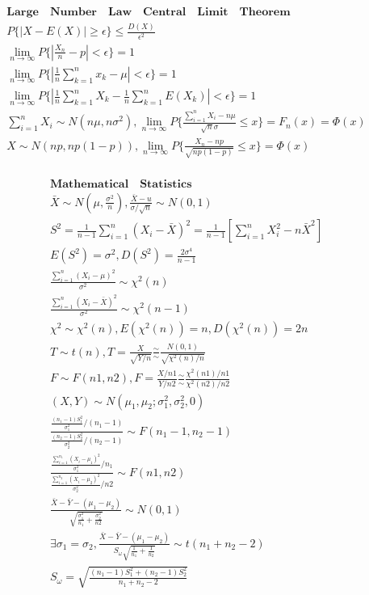 \documentclass{article}
\begin{document}
\begin{align*}
    \bm{Large \quad Number \quad Law \quad Central \quad Limit \quad Theorem } \\ 
    P \{ {|X-E(X)|\ge \epsilon} \} \le \frac{D(X)}{\epsilon^{2}} \\
    \lim_{n \to \infty}P\{|\frac{X_{n}}{n}-p| < \epsilon\} = 1 \\
    \lim_{n \to \infty}P\{|\frac{1}{n}\sum_{k=1}^nx_{k}-\mu|<\epsilon\} = 1 \\
    \lim_{n \to \infty}P\{|\frac{1}{n}\sum_{k=1}^n X_{k} - \frac{1}{n}\sum_{k=1}^n E(X_{k})| < \epsilon\} = 1 \\ 
    \sum_{i=1}^{n}X_{i} \sim N(n\mu,n\sigma^2), \lim_{n \to \infty}P\{\frac{\sum_{i=1}^nX_{i}-n\mu}{\sqrt{n}\sigma} \le x\} = F_{n}(x) = \Phi(x) \\ 
    X \sim N(np,np(1-p)), \lim_{n \to \infty }P\{\frac{X_{n}-np}{\sqrt{np(1-p)}} \le x \} = \Phi(x) \\ 
\end{align*}

\clearpage
\begin{align*}
    \bm{Mathematical \quad Statistics} \\ 
    \bar{X} \sim N(\mu,\frac{\sigma^2}{n}), \frac{\bar{X}-u}{\sigma/\sqrt{n}} \sim N(0,1)\\ 
    S^2 = \frac{1}{n-1}\sum_{i=1}^n(X_{i}-\bar{X})^2 = \frac{1}{n-1}[\sum_{i=1}^nX_{i}^2 - n \bar{X}^2] \\ 
    E(S^2) = \sigma^2, D(S^2) = \frac{2\sigma^4}{n-1} \\ 
    \frac{\sum_{i=1}^n(X_{i}-\mu)^2}{\sigma^2} \sim \chi^2(n) \\ 
    \frac{\sum_{i=1}^n(X_{i}-\bar{X})^2}{\sigma^2} \sim \chi^2(n-1) \\ 
    \chi^2 \sim \chi^2(n), E(\chi^2(n)) = n, D(\chi^2(n)) = 2n \\ 
    T \sim t(n), T = \frac{X}{\sqrt{Y/n}} \frac{\sim}{\sim} \frac{N(0,1)}{\sqrt{\chi^2(n)/n}}\\
    F \sim F(n1,n2), F = \frac{X/n1}{Y/n2} \frac{\sim}{\sim} \frac{\chi^2(n1)/n1}{\chi^2(n2)/n2} \\ 
    (X,Y) \sim N(\mu_{1},\mu_{2};\sigma_{1}^2,\sigma_{2}^2,0) \\ 
    \frac{\frac{(n_{1}-1)S_{1}^2}{\sigma_{1}^2}/(n_{1}-1)}{\frac{(n_{2}-1)S_{2}^2}{\sigma_{2}^2}/(n_{2}-1)} \sim F(n_{1}-1,n_{2}-1) \\
    \frac{\frac{\sum_{i=1}^{n_{1}}(X_{i}-\mu_{1})^2}{\sigma_{1}^2}/n_{1}}{\frac{\sum_{i=1}^{n_{2}}(X_{i}-\mu_{2})^2}{\sigma_{2}^2}/n2} \sim F(n1,n2) \\  
    \frac{\bar{X}-\bar{Y}-(\mu_{1}-\mu_{2})}{\sqrt{\frac{\sigma_{1}^2}{n_{1}}+\frac{\sigma_{2}^2}{n2}}} \sim N(0,1) \\ 
    \exists \sigma_{1} = \sigma_{2}, \frac{\bar{X}-\bar{Y}-(\mu_{1}-\mu_{2})}{S_{\omega}\sqrt{\frac{1}{n_{1}}+\frac{1}{n_{2}}}} \sim t(n_{1}+n_{2}-2) \\ 
    S_{\omega} = \sqrt{\frac{(n_{1}-1)S_{1}^2+(n_{2}-1)S_{2}^2 }{n_{1}+n_{2}-2}}
\end{align*}
\end{document}
